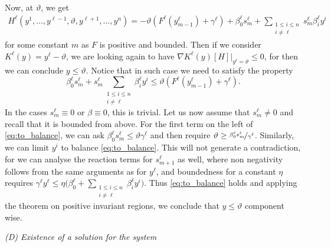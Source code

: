\documentclass[11pt]{article}
\begin{document}
Now, at \(\vartheta\), we get
\begin{align*}
	H^\ell( y^1, \ldots, y^{\ell-1}, \vartheta, y^{\ell+1}, \ldots, y^n ) 
	= -\vartheta ( F^\ell(y_{m-1}^\ell) + \gamma^\ell) + \beta_0^\ell s_m^\ell + \sum_{\substack{1\le i\le n\\ i\neq \ell}}  s_m^\ell \beta_i^\ell  y^i 
\end{align*}
for some constant \(m\) as \(F\) is positive and bounded. Then if we consider \(K^\ell(y) = y^\ell - \vartheta \), we are looking again to have \(\nabla K^\ell(y)[H] \big|_{y^\ell = \vartheta} \leq 0\), for then we can conclude \( y \leq \vartheta\). 
%
Notice that in such case we need to satisfy the property
\begin{equation}
\label{eq:to_balance}
	\beta_0^\ell s_m^\ell + s_m^\ell \sum_{\substack{1\le i\le n\\ i\neq \ell}}  \beta_i^\ell  y^i \leq \vartheta ( F^\ell(y_{m-1}^\ell) + \gamma^\ell).
\end{equation}
In the cases \(s_m^\ell \equiv 0\) or \(\beta \equiv 0\), this is trivial. Let us now assume that \(s_m^\ell \neq 0 \) and recall that it is bounded from above. For the first term on the left of \eqref{eq:to_balance}, we can ask \( \beta_0^\ell s_m^\ell  \leq \vartheta  \gamma^\ell\) and then require \( \vartheta \geq \nicefrac{\beta_0^\ell s_m^\ell}{\gamma^\ell}\). Similarly, we can limit \(y^i\) to balance \eqref{eq:to_balance}.
This will not generate a contradiction, for we can analyse the reaction terms for \(s_{m+1}^\ell\) as well, where non negativity follows from the same arguments as for \(y^\ell\), and boundedness for a constant \(\eta\) requires
\(
	\gamma^\ell y^\ell 
	\leq \eta \big( \beta_0^\ell + \sum_{\substack{1\le i\le n\\ i\neq \ell}} \beta_i^\ell y^i\big)
\). Thus \eqref{eq:to_balance} holds and applying the theorem on positive invariant regions, we conclude that \( y\leq \vartheta\) component wise. 


\vspace{1\baselineskip}
\noindent\emph{(D) Existence of a solution for the system}
\vspace{0.5\baselineskip}
\end{document}
